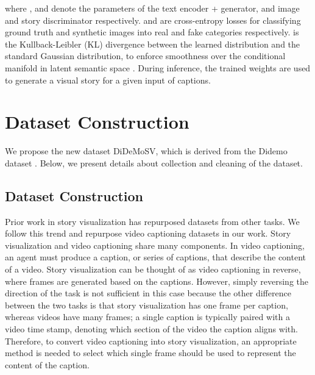 \documentclass[runningheads]{llncs}
\begin{document}
where ,  and  denote the parameters of the text encoder + generator, and image and story discriminator respectively.  and  are cross-entropy losses for classifying ground truth and synthetic images into real and fake categories respectively.  is the Kullback-Leibler (KL) divergence between the learned distribution  and the standard Gaussian distribution, to enforce smoothness over the conditional manifold in latent semantic space \cite{li2019storygan}. During inference, the trained weights  are used to generate a visual story for a given input of captions.



\section{Dataset Construction} \label{sec:datasets_arxiv}

We propose the new dataset DiDeMoSV, which is derived from the Didemo dataset \cite{hendricks17iccv}. Below, we present details about collection and cleaning of the dataset.

\subsection{Dataset Construction}
Prior work in story visualization has repurposed datasets from other tasks. We follow this trend and repurpose video captioning datasets in our work. Story visualization and video captioning share many components. In video captioning, an agent must produce a caption, or series of captions, that describe the content of a video. Story visualization can be thought of as video captioning in reverse, where frames are generated based on the captions. However, simply reversing the direction of the task is not sufficient in this case because the other difference between the two tasks is that story visualization has one frame per caption, whereas videos have many frames; a single caption is typically paired with a video time stamp, denoting which section of the video the caption aligns with. Therefore, to convert video captioning into story visualization, an appropriate method is needed to select which single frame should be used to represent the content of the caption.
\end{document}
